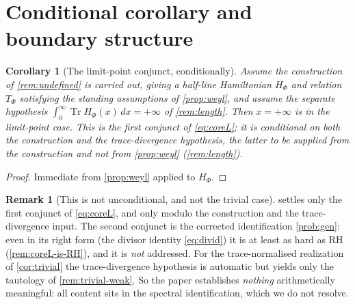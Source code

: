 \documentclass[12pt,a4paper]{amsart}
\theoremstyle{plain}
\newtheorem{corollary}[theorem]{Corollary}
\theoremstyle{definition}
\newtheorem{remark}[theorem]{Remark}
\newcommand{\Tr}{\operatorname{Tr}}
\newcommand{\Ham}{H}
\begin{document}
\section{Conditional corollary and boundary structure}
\label{sec:proof}

\begin{corollary}[The limit-point conjunct, conditionally]\label{cor:conditional}
  Assume the construction of \cref{rem:undefined} is carried out, giving a
  half-line Hamiltonian $\Ham_\Phi$ and relation $T_\Phi$ satisfying the
  standing assumptions of \cref{prop:weyl}, and assume the separate
  hypothesis $\int_0^\infty \Tr\Ham_\Phi(x)\,dx = +\infty$ of
  \cref{rem:length}.  Then $x=+\infty$ is in the limit-point case.  This is
  the first conjunct of \cref{eq:coreL}; it is \emph{conditional} on both
  the construction and the trace-divergence hypothesis, the latter to be
  supplied from the construction and \emph{not} from \cref{prop:weyl}
  (\cref{rem:length}).
\end{corollary}

\begin{proof}
  Immediate from \cref{prop:weyl} applied to $\Ham_\Phi$.
\end{proof}

\begin{remark}[This is not unconditional, and not the trivial case]\label{rem:not-uncond}
   settles only the first conjunct of
  \cref{eq:coreL}, and only modulo the construction and the
  trace-divergence input.  The second conjunct is the corrected
  identification \cref{prob:gen}: even in its right form (the divisor
  identity \cref{eq:divid}) it is at least as hard as RH
  (\cref{rem:coreL-is-RH}), and it is \emph{not} addressed.  For the
  trace-normalised realization of \cref{cor:trivial} the trace-divergence
  hypothesis is automatic but yields only the tautology of
  \cref{rem:trivial-weak}.  So the paper establishes \emph{nothing}
  arithmetically meaningful: all content sits in the spectral
  identification, which we do not resolve.
\end{remark}
\end{document}
